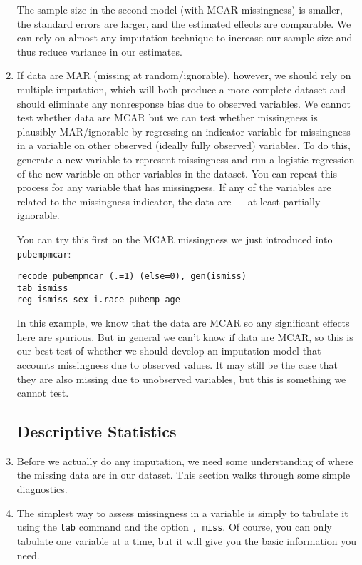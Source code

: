 \documentclass[a4paper,12pt]{article}
\begin{document}
\begin{enumerate}
The sample size in the second model (with MCAR missingness) is smaller, the standard errors are larger, and the estimated effects are comparable. We can rely on almost any imputation technique to increase our sample size and thus reduce variance in our estimates.

\item If data are MAR (missing at random/ignorable), however, we should rely on multiple imputation, which will both produce a more complete dataset and should eliminate any nonresponse bias due to observed variables. We cannot test whether data are MCAR but we can test whether missingness is plausibly MAR/ignorable by regressing an indicator variable for missingness in a variable on other observed (ideally fully observed) variables. To do this, generate a new variable to represent missingness and run a logistic regression of the new variable on other variables in the dataset. You can repeat this process for any variable that has missingness. If any of the variables are related to the missingness indicator, the data are --- at least partially --- ignorable.

You can try this first on the MCAR missingness we just introduced into \texttt{pubempmcar}:

\begin{verbatim}
recode pubempmcar (.=1) (else=0), gen(ismiss)
tab ismiss
reg ismiss sex i.race pubemp age
\end{verbatim}

In this example, we know that the data are MCAR so any significant effects here are spurious. But in general we can't know if data are MCAR, so this is our best test of whether we should develop an imputation model that accounts missingness due to observed values.  It may still be the case that they are also missing due to unobserved variables, but this is something we cannot test.

\subsection*{Descriptive Statistics}

\item Before we actually do any imputation, we need some understanding of where the missing data are in our dataset. This section walks through some simple diagnostics.

\item The simplest way to assess missingness in a variable is simply to tabulate it using the \texttt{tab} command and the option \texttt{, miss}. Of course, you can only tabulate one variable at a time, but it will give you the basic information you need.


\end{enumerate}
\end{document}
